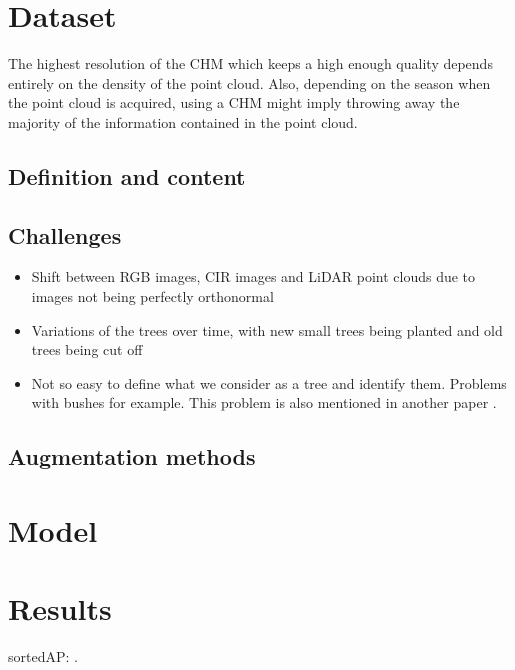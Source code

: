 \documentclass[
]{report}
\providecommand{\tightlist}{%
  \setlength{\itemsep}{0pt}\setlength{\parskip}{0pt}}\usepackage{longtable,booktabs,array}
\begin{document}
\chapter{Dataset}\label{sec-dataset}

The highest resolution of the CHM which keeps a high enough quality
depends entirely on the density of the point cloud. Also, depending on
the season when the point cloud is acquired, using a CHM might imply
throwing away the majority of the information contained in the point
cloud.

\section{Definition and content}\label{definition-and-content}

\section{Challenges}\label{challenges}

\begin{itemize}
\tightlist
\item
  Shift between RGB images, CIR images and LiDAR point clouds due to
  images not being perfectly orthonormal
\item
  Variations of the trees over time, with new small trees being planted
  and old trees being cut off
\item
  Not so easy to define what we consider as a tree and identify them.
  Problems with bushes for example. This problem is also mentioned in
  another paper \autocite{DeepForestBefore}.
\end{itemize}

\section{Augmentation methods}\label{augmentation-methods}

\chapter{Model}\label{model}

\chapter{Results}\label{results}

sortedAP: \autocite{sortedAP}.
\end{document}
